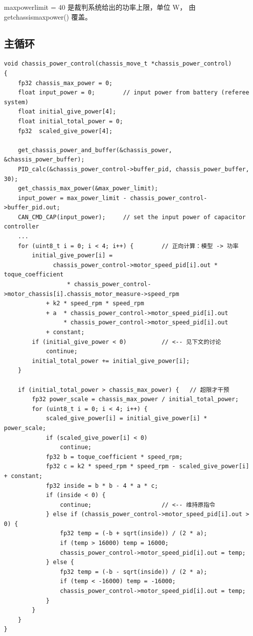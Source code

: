 \documentclass[cn,blue,11pt,device=normal]{elegantnote}
\newcommand{\code}[1]{{\ttfamily\small\def\_{\textunderscore\allowbreak}#1}}
\begin{document}
\code{max\_power\_limit = 40} 是裁判系统给出的功率上限，单位 W，
由 \code{get\_chassis\_max\_power()} 覆盖。

\subsection{主循环}

\begin{lstlisting}[style=cstyle, label={lst:main}]
void chassis_power_control(chassis_move_t *chassis_power_control)
{
    fp32 chassis_max_power = 0;
    float input_power = 0;        // input power from battery (referee system)
    float initial_give_power[4];
    float initial_total_power = 0;
    fp32  scaled_give_power[4];

    get_chassis_power_and_buffer(&chassis_power, &chassis_power_buffer);
    PID_calc(&chassis_power_control->buffer_pid, chassis_power_buffer, 30);
    get_chassis_max_power(&max_power_limit);
    input_power = max_power_limit - chassis_power_control->buffer_pid.out;
    CAN_CMD_CAP(input_power);     // set the input power of capacitor controller
    ...
    for (uint8_t i = 0; i < 4; i++) {        // 正向计算：模型 -> 功率
        initial_give_power[i] =
              chassis_power_control->motor_speed_pid[i].out * toque_coefficient
                  * chassis_power_control->motor_chassis[i].chassis_motor_measure->speed_rpm
            + k2 * speed_rpm * speed_rpm
            + a  * chassis_power_control->motor_speed_pid[i].out
                 * chassis_power_control->motor_speed_pid[i].out
            + constant;
        if (initial_give_power < 0)          // <-- 见下文的讨论
            continue;
        initial_total_power += initial_give_power[i];
    }

    if (initial_total_power > chassis_max_power) {   // 超限才干预
        fp32 power_scale = chassis_max_power / initial_total_power;
        for (uint8_t i = 0; i < 4; i++) {
            scaled_give_power[i] = initial_give_power[i] * power_scale;
            if (scaled_give_power[i] < 0)
                continue;
            fp32 b = toque_coefficient * speed_rpm;
            fp32 c = k2 * speed_rpm * speed_rpm - scaled_give_power[i] + constant;
            fp32 inside = b * b - 4 * a * c;
            if (inside < 0) {
                continue;                    // <-- 维持原指令
            } else if (chassis_power_control->motor_speed_pid[i].out > 0) {
                fp32 temp = (-b + sqrt(inside)) / (2 * a);
                if (temp > 16000) temp = 16000;
                chassis_power_control->motor_speed_pid[i].out = temp;
            } else {
                fp32 temp = (-b - sqrt(inside)) / (2 * a);
                if (temp < -16000) temp = -16000;
                chassis_power_control->motor_speed_pid[i].out = temp;
            }
        }
    }
}
\end{lstlisting}
\end{document}
